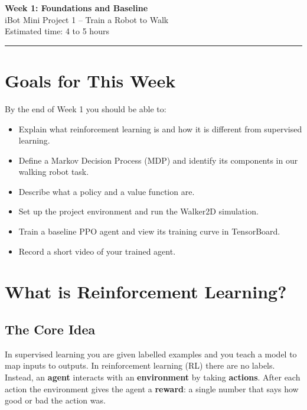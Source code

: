 \documentclass[12pt, a4paper]{article}
\begin{document}
\begin{center}
    {\LARGE \textbf{Week 1: Foundations and Baseline}}\\[0.4em]
    {\large iBot Mini Project 1 -- Train a Robot to Walk}\\[0.2em]
    {\normalsize Estimated time: 4 to 5 hours}
\end{center}

\hrule
\vspace{0.5em}

\tableofcontents
\newpage

\section{Goals for This Week}

By the end of Week 1 you should be able to:
\begin{itemize}
    \item Explain what reinforcement learning is and how it is different from supervised learning.
    \item Define a Markov Decision Process (MDP) and identify its components in our walking robot task.
    \item Describe what a policy and a value function are.
    \item Set up the project environment and run the Walker2D simulation.
    \item Train a baseline PPO agent and view its training curve in TensorBoard.
    \item Record a short video of your trained agent.
\end{itemize}

\section{What is Reinforcement Learning?}

\subsection{The Core Idea}

In supervised learning you are given labelled examples and you teach a model to map inputs to outputs. In reinforcement learning (RL) there are no labels. Instead, an \textbf{agent} interacts with an \textbf{environment} by taking \textbf{actions}. After each action the environment gives the agent a \textbf{reward}: a single number that says how good or bad the action was.
\end{document}
